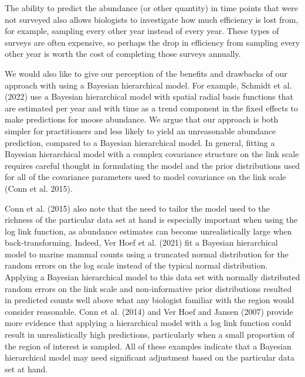 \documentclass[smallextended]{svjour3}       %
\begin{document}
The ability to predict the abundance (or other quantity) in time points
that were not surveyed also allows biologists to investigate how much
efficiency is lost from, for example, sampling every other year instead
of every year. These types of surveys are often expensive, so perhaps
the drop in efficiency from sampling every other year is worth the cost
of completing those surveys annually.

We would also like to give our perception of the benefits and drawbacks
of our approach with using a Bayesian hierarchical model. For example,
Schmidt et al. (2022) use a Bayesian hierarchical model with spatial
radial basis functions that are estimated per year and with time as a
trend component in the fixed effects to make predictions for moose
abundance. We argue that our approach is both simpler for practitioners
and less likely to yield an unreasonable abundance prediction, compared
to a Bayesian hierarchical model. In general, fitting a Bayesian
hierarchical model with a complex covariance structure on the link scale
requires careful thought in formulating the model and the prior
distributions used for all of the covariance parameters used to model
covariance on the link scale (Conn et al. 2015).

Conn et al. (2015) also note that the need to tailor the model used to
the richness of the particular data set at hand is especially important
when using the log link function, as abundance estimates can become
unrealistically large when back-transforming. Indeed, Ver Hoef et al.
(2021) fit a Bayesian hierarchical model to marine mammal counts using a
truncated normal distribution for the random errors on the log scale
instead of the typical normal distribution. Applying a Bayesian
hierarchical model to this data set with normally distributed random
errors on the link scale and non-informative prior distributions
resulted in predicted counts well above what any biologist familiar with
the region would consider reasonable. Conn et al. (2014) and Ver Hoef
and Jansen (2007) provide more evidence that applying a hierarchical
model with a log link function could result in unrealistically high
predictions, particularly when a small proportion of the region of
interest is sampled. All of these examples indicate that a Bayesian
hierarchical model may need significant adjustment based on the
particular data set at hand.
\end{document}
